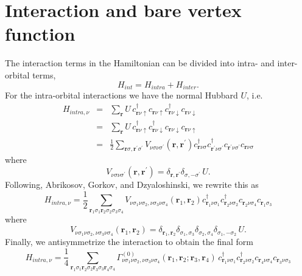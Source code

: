 \chapter{Interaction and bare vertex function}
\label{chapter:bare_vertex}

The interaction terms in the Hamiltonian can be divided into
intra- and inter-orbital terms,
\begin{equation}
H_{int}  =  H_{intra} + H_{inter}. 
\end{equation}
For the intra-orbital interactions we have the normal Hubbard $U$, i.e.
\begin{eqnarray}
H_{intra,\nu} & = & \sum_{\mathbf{r}} 
 U\, 
c^{\dagger}_{\mathbf{r}\nu\uparrow}
c_{\mathbf{r}\nu\uparrow}
c^{\dagger}_{\mathbf{r}\nu\downarrow} 
c_{\mathbf{r}\nu\downarrow} 
\\
& = & \sum_{\mathbf{r}} 
U\, 
c^{\dagger}_{\mathbf{r}\nu\uparrow}
c^{\dagger}_{\mathbf{r}\nu\downarrow}
c_{\mathbf{r}\nu\downarrow}
c_{\mathbf{r}\nu\uparrow}
\\
& = & \frac{1}{2} \sum_{\mathbf{r}\sigma,\mathbf{r}^{\prime}\sigma^{\prime}}
 V_{\nu\sigma\nu\sigma^{\prime}}(\mathbf{r},\mathbf{r}^{\prime}) 
c^{\dagger}_{\mathbf{r}\nu\sigma}
c^{\dagger}_{\mathbf{r}^{\prime}\nu\sigma^{\prime}}
c_{\mathbf{r}^{\prime}\nu\sigma^{\prime}}
c_{\mathbf{r}\nu\sigma}
\end{eqnarray}
where 
\begin{equation}
V_{\nu\sigma\nu\sigma^{\prime}}(\mathbf{r}, \mathbf{r}^{\prime} ) = 
\delta_{\mathbf{r},\mathbf{r}^{\prime}} \delta_{\sigma,-\sigma^{\prime}}\, U.
\end{equation}
Following, Abrikosov, Gorkov, and Dzyaloshinski, we rewrite
this as
\begin{equation}
H_{intra,\nu} = \frac{1}{2} \sum_{\mathbf{r}_1\sigma_1 \mathbf{r}_2 
\sigma_2 \sigma_3 \sigma_4}
 V_{\nu\sigma_1\nu\sigma_2,\nu\sigma_3\nu\sigma_4}(\mathbf{r}_1,\mathbf{r}_2) 
c^{\dagger}_{\mathbf{r}_1\nu\sigma_1}
c^{\dagger}_{\mathbf{r}_2\nu\sigma_2}
c_{\mathbf{r}_2\nu\sigma_4}
c_{\mathbf{r}_1\sigma_3}
\end{equation}
where
\begin{equation}
V_{\nu\sigma_1 \nu\sigma_2,\nu\sigma_3\nu\sigma_4}(\mathbf{r}_1, \mathbf{r}_2 ) = 
\delta_{\mathbf{r}_1,\mathbf{r}_2}\delta_{\sigma_1,\sigma_3} \delta_{\sigma_2,\sigma_4}
 \delta_{\sigma_1,-\sigma_2}\, U.
\end{equation}
Finally, we antisymmetrize the interaction to obtain the final
form
\begin{equation}
H_{intra,\nu} = \frac{1}{4} \sum_{\mathbf{r}_1\sigma_1
\mathbf{r}_2\sigma_2 \mathbf{r}_3\sigma_3 \mathbf{r}_4\sigma_4}
 \Gamma^{(0)}_{\nu\sigma_1\nu\sigma_2,\nu\sigma_3\nu\sigma_4}(\mathbf{r}_1, \mathbf{r}_2; 
\mathbf{r}_3, \mathbf{r}_4) 
\,c^{\dagger}_{\mathbf{r}_1\nu\sigma_1}
c^{\dagger}_{\mathbf{r}_2 \nu\sigma_2}
c_{\mathbf{r}_4\nu\sigma_4}
c_{\mathbf{r}_3 \nu \sigma_3}
\end{equation}
